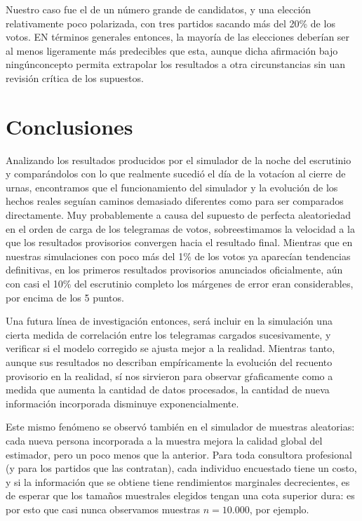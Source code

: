 \documentclass[12pt, a4paper]{article}
\begin{document}
Nuestro caso fue el de un n\'umero grande de candidatos, y una elecci\'on relativamente poco polarizada, con tres partidos sacando m\'as del 20\% de los votos. EN t\'erminos generales entonces, la mayor\'ia de las elecciones deber\'ian ser al menos ligeramente m\'as predecibles que esta, aunque dicha afirmaci\'on bajo ning\'unconcepto permita extrapolar los resultados a otra circunstancias sin uan revisi\'on cr\'itica de los supuestos.

\section{Conclusiones}

Analizando los resultados producidos por el simulador de la noche del escrutinio y compar\'andolos con lo que realmente sucedi\'o el d\'ia de la votac\'ion al cierre de urnas, encontramos que el funcionamiento del simulador y la evoluci\'on de los hechos reales segu\'ian caminos demasiado diferentes como para ser comparados directamente.
Muy probablemente a causa del supuesto de perfecta aleatoriedad en el orden de carga de los telegramas de votos, sobreestimamos la velocidad a la que los resultados provisorios convergen hacia el resultado final. Mientras que en nuestras simulaciones con poco m\'as del 1\% de los votos ya aparec\'ian tendencias definitivas, en los primeros resultados provisorios anunciados oficialmente, a\'un con casi el 10\% del escrutinio completo los m\'argenes de error eran considerables, por encima de los 5 puntos.

Una futura l\'inea de investigaci\'on entonces, ser\'a incluir en la simulaci\'on una cierta medida de correlaci\'on entre los telegramas cargados sucesivamente, y verificar si el modelo corregido se ajusta mejor a la realidad. Mientras tanto, aunque sus resultados no describan emp\'iricamente la evoluci\'on del recuento provisorio en la realidad, s\'i nos sirvieron para observar g\'raficamente como a medida que aumenta la cantidad de datos procesados, la cantidad de nueva informaci\'on incorporada disminuye exponencialmente.

Este mismo fen\'omeno se observ\'o tambi\'en en el simulador de muestras aleatorias: cada nueva persona incorporada a la muestra mejora la calidad global del estimador, pero un poco menos que la anterior. Para toda consultora profesional (y para los partidos que las contratan), cada individuo encuestado tiene un costo, y si la informaci\'on que se obtiene tiene rendimientos marginales decrecientes, es de esperar que los tama\~nos muestrales elegidos tengan una cota superior dura: es por esto que casi nunca observamos muestras $n=10.000$, por ejemplo.
\end{document}
